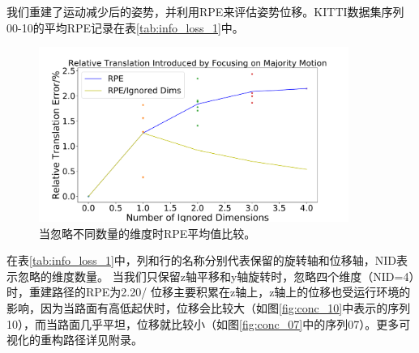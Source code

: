 我们重建了运动减少后的姿势，并利用RPE\cite{geiger2012kitti}来评估姿势位移。KITTI数据集序列00-10的平均RPE记录在表\ref{tab:info_loss_1}中。

\begin{figure}[ht]
    \centering
    \includegraphics[width=0.9\textwidth]{datavo/info_loss.pdf}
    \caption{当忽略不同数量的维度时RPE平均值比较。}
    \label{fig:info_loss}
\end{figure}
在表\ref{tab:info_loss_1}中，列和行的名称分别代表保留的旋转轴和位移轴，NID表示忽略的维度数量。
当我们只保留z轴平移和y轴旋转时，忽略四个维度（NID=4）时，重建路径的RPE为2.20/%
位移主要积累在z轴上，z轴上的位移也受运行环境的影响，因为当路面有高低起伏时，位移会比较大（如图\ref{fig:conc_10}中表示的序列10），而当路面几乎平坦，位移就比较小（如图\ref{fig:conc_07}中的序列07）。更多可视化的重构路径详见附录。

